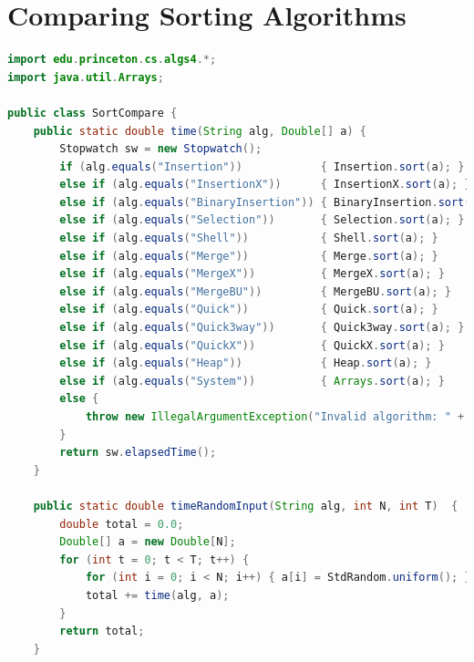 \documentclass[8pt,a4paper,compress]{beamer}
\begin{document}
\section{Comparing Sorting Algorithms}
\begin{frame}[fragile]
\begin{lstlisting}[language=Java]
import edu.princeton.cs.algs4.*;
import java.util.Arrays;

public class SortCompare { 
    public static double time(String alg, Double[] a) { 
        Stopwatch sw = new Stopwatch(); 
        if (alg.equals("Insertion"))            { Insertion.sort(a); }
        else if (alg.equals("InsertionX"))      { InsertionX.sort(a); }
        else if (alg.equals("BinaryInsertion")) { BinaryInsertion.sort(a); }
        else if (alg.equals("Selection"))       { Selection.sort(a); }
        else if (alg.equals("Shell"))           { Shell.sort(a); }
        else if (alg.equals("Merge"))           { Merge.sort(a); }
        else if (alg.equals("MergeX"))          { MergeX.sort(a); }
        else if (alg.equals("MergeBU"))         { MergeBU.sort(a); } 
        else if (alg.equals("Quick"))           { Quick.sort(a); }
        else if (alg.equals("Quick3way"))       { Quick3way.sort(a); }
        else if (alg.equals("QuickX"))          { QuickX.sort(a); }
        else if (alg.equals("Heap"))            { Heap.sort(a); }
        else if (alg.equals("System"))          { Arrays.sort(a); }
        else {
            throw new IllegalArgumentException("Invalid algorithm: " + alg);
        }
        return sw.elapsedTime(); 
    } 

    public static double timeRandomInput(String alg, int N, int T)  {
        double total = 0.0; 
        Double[] a = new Double[N]; 
        for (int t = 0; t < T; t++) {
            for (int i = 0; i < N; i++) { a[i] = StdRandom.uniform(); }
            total += time(alg, a); 
        } 
        return total; 
    }
\end{lstlisting}
\end{frame}
\end{document}
